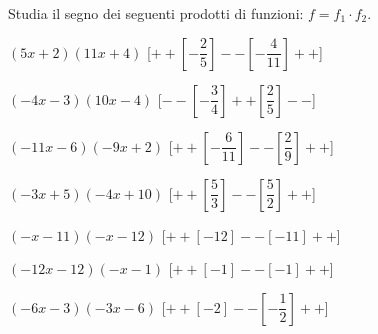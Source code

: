 \begin{esercizio}\label{ese:dis_6}
 Studia il segno dei seguenti prodotti di funzioni: \(f = f_1 \cdot f_2\).
 \begin{enumeratea}
  \item  \(\left(5 x +2\right)\left(11 x +4\right)\) \hfill 
  [\(++\left [-\dfrac{2}{5} \right ]--\left [-\dfrac{4}{11} \right ]++\)]
  \item  \(\left(-4 x -3\right)\left(10 x -4\right)\) \hfill 
  [\(--\left [-\dfrac{3}{4} \right ]++\left [\dfrac{2}{5} \right ]--\)]
  \item  \(\left(-11 x -6\right)\left(-9 x +2\right)\) \hfill 
  [\(++\left [-\dfrac{6}{11} \right ]--\left [\dfrac{2}{9} \right ]++\)]
  \item  \(\left(-3 x +5\right)\left(-4 x +10\right)\) \hfill 
  [\(++\left [\dfrac{5}{3} \right ]--\left [\dfrac{5}{2} \right ]++\)]
  \item  \(\left(- x -11\right)\left(- x -12\right)\) \hfill 
  [\(++\left [-12 \right ]--\left [-11 \right ]++\)]
  \item  \(\left(-12 x -12\right)\left(- x -1\right)\) \hfill 
  [\(++\left [-1 \right ]--\left [-1 \right ]++\)]
  \item  \(\left(-6 x -3\right)\left(-3 x -6\right)\) \hfill 
  [\(++\left [-2 \right ]--\left [-\dfrac{1}{2} \right ]++\)]
 \end{enumeratea}
\end{esercizio}


\subsubsection*{}


